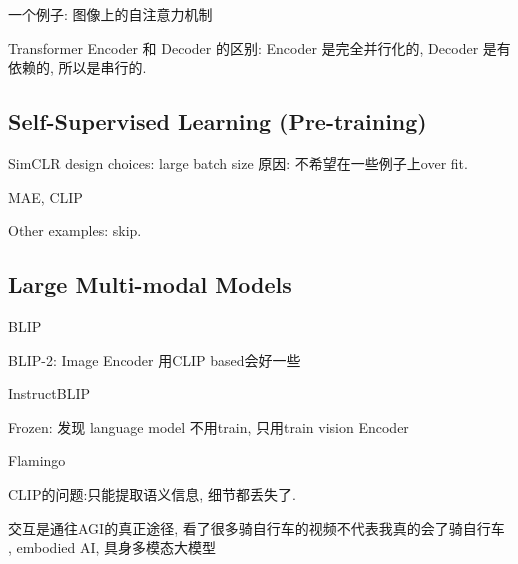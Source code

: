 一个例子: 图像上的自注意力机制

Transformer Encoder 和 Decoder 的区别: Encoder 是完全并行化的, Decoder 是有依赖的, 所以是串行的.

\subsection{Self-Supervised Learning (Pre-training)}

SimCLR design choices: large batch size 原因: 不希望在一些例子上over fit.

MAE, CLIP

Other examples: skip.

\subsection{Large Multi-modal Models}

BLIP

BLIP-2: Image Encoder 用CLIP based会好一些

InstructBLIP

Frozen: 发现 language model 不用train, 只用train vision Encoder

Flamingo

CLIP的问题:只能提取语义信息, 细节都丢失了.

交互是通往AGI的真正途径, 看了很多骑自行车的视频不代表我真的会了骑自行车
, embodied AI, 具身多模态大模型
